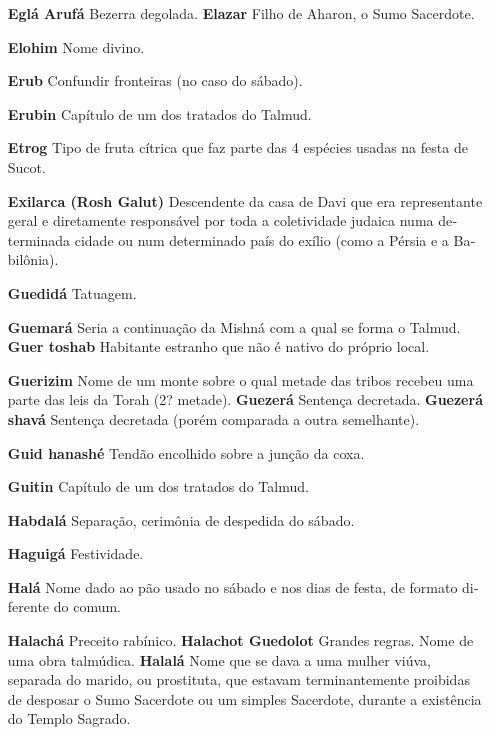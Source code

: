 \begin{itemize}
\begin{enumrate}
\begin{itemize}
\begin{itemize}
\begin{itemize}
\begin{itemize}
\begin{itemize}
\item[\textbf{Eglá Arufá} Bezerra degolada. \textbf{Elazar}] Filho de
Aharon, o Sumo Sa­cerdote.

\item[\textbf{Elohim}] Nome divino.

\item[\textbf{Erub}] Confundir fronteiras (no caso do sábado).

\item[\textbf{Erubin}] Capítulo de um dos tratados do Talmud.

\item[\textbf{Etrog}] Tipo de fruta cítrica que faz parte das 4 espécies
usadas na festa de Sucot.

\item[\textbf{Exilarca (Rosh Galut)}] Descenden­te da casa de Davi que era
representan­te geral e diretamente responsável por toda a coletividade
judaica numa de­terminada cidade ou num determina­do país do exílio
(como a Pérsia e a Ba­bilônia).

\item[\textbf{Guedidá}] Tatuagem.

\item[\textbf{Guemará}] Seria a continuação da Mishná com a qual se forma o
Talmud. \textbf{Guer toshab} Habitante estranho que não é nativo do
próprio local.

\item[\textbf{Guerizim}] Nome de um monte sobre
o qual metade das tribos recebeu uma parte das leis da Torah (2?
metade). \textbf{Guezerá} Sentença decretada. \textbf{Guezerá shavá}
Sentença decreta­da (porém comparada a outra seme­lhante).

\item[\textbf{Guid hanashé}] Tendão encolhido so­bre a junção da coxa.

\item[\textbf{Guitin}] Capítulo de um dos tratados do Talmud.

\item[\textbf{Habdalá}] Separação, cerimônia de despedida do sábado.

\item[\textbf{Haguigá}] Festividade.

\item[\textbf{Halá}] Nome dado ao pão usado no sá­bado e nos dias de festa,
de formato di­ferente do comum.

\item[\textbf{Halachá} Preceito rabínico. \textbf{Halachot Guedolot}]
Grandes regras. Nome de uma obra talmúdica. \textbf{Halalá} Nome que
se dava a uma mu­lher viúva, separada do marido, ou prostituta, que
estavam terminante­mente proibidas de desposar o Sumo Sacerdote ou um
simples Sacerdote, durante a existência do Templo Sa­grado.


\end{itemize}
\end{itemize}
\end{itemize}
\end{itemize}
\end{itemize}
\end{enumrate}
\end{itemize}
